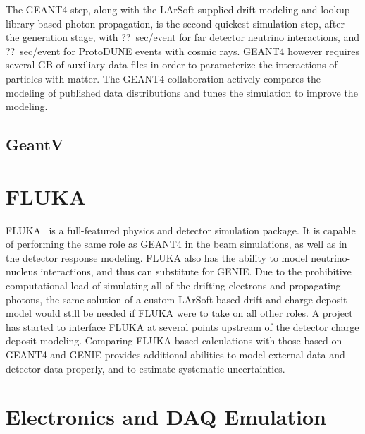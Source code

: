 The GEANT4 step, along with the LArSoft-supplied drift modeling and lookup-library-based photon propagation, 
is the second-quickest simulation step,
after the generation stage, with ??~sec/event for far detector neutrino interactions, and ??~sec/event for
ProtoDUNE events with cosmic rays.  GEANT4 however requires several GB of auxiliary data files in order
to parameterize the interactions of particles with matter.  The GEANT4 collaboration actively compares
the modeling of published data distributions and tunes the simulation to improve the modeling.

\subsection{GeantV}

\section{FLUKA}

FLUKA~\cite{FLUKA} is a full-featured physics and detector simulation package.  It is capable of
performing the same role as GEANT4 in the beam simulations, as well as in the detector response modeling.
FLUKA also has the ability to model neutrino-nucleus interactions, and thus can substitute for GENIE.
Due to the prohibitive computational load of simulating all of the drifting electrons and propagating
photons, the same solution of a custom LArSoft-based drift and charge deposit model would still be needed
if FLUKA were to take on all other roles.  A project has started to interface FLUKA at several points upstream
of the detector charge deposit modeling.  Comparing FLUKA-based calculations with those based on GEANT4 and
GENIE provides additional abilities to model external data and detector data properly, and to estimate
systematic uncertainties.

\section{Electronics and DAQ Emulation}

